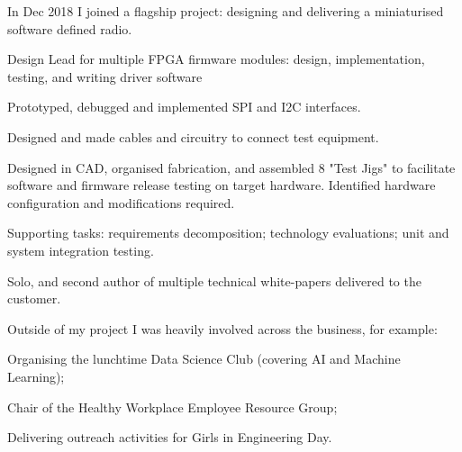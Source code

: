 {}

In Dec 2018 I joined a flagship project: designing and delivering a miniaturised software defined radio.
\begin{tightemize}
  \item Design Lead for multiple FPGA firmware modules: design, implementation, testing, and writing driver software
  \item Prototyped, debugged and implemented SPI and I2C interfaces.
  \item Designed and made cables and circuitry to connect test equipment.
  \item Designed in CAD, organised fabrication, and assembled 8 "Test Jigs" to facilitate software and firmware release testing on target hardware.
  Identified hardware configuration and modifications required.
  \item Supporting tasks: requirements decomposition; technology evaluations; unit and system integration testing.
  \item Solo, and second author of multiple technical white-papers delivered to the customer.
\end{tightemize}

\vspace{0.5em}
Outside of my project I was heavily involved across the business, for example:
\begin{tightemize}
    \item Organising the lunchtime Data Science Club (covering AI and Machine Learning);
    \item Chair of the Healthy Workplace Employee Resource Group;
    \item Delivering outreach activities for Girls in Engineering Day.
\end{tightemize}

\sectionsep
